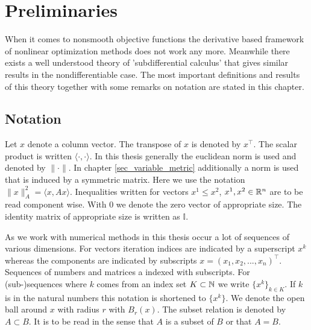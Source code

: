 \section{Preliminaries}
\label{sec_prelim}

When it comes to nonsmooth objective functions the  derivative based framework of nonlinear optimization methods does not work any more. Meanwhile there exists a well understood theory of 'subdifferential calculus' that gives similar results in the nondifferentiable case.
The most important definitions and results of this theory together with some remarks on notation are stated in this chapter.


\subsection{Notation}

Let \(x\) denote a column vector. The transpose of \(x\) is denoted by \(x^{\top}\). The scalar product is written \(\langle \cdot, \cdot \rangle\).
In this thesis generally the euclidean norm is used and denoted by \(\|\cdot\|\). In chapter \ref{sec_variable_metric} additionally a norm is used that is induced by a symmetric matrix. Here we use the notation \(\|x\|^2_A = {\langle x, Ax \rangle}\).
Inequalities written for vectors \(x^1 \leq x^2\), \(x^1, x^2 \in \mathbb{R}^n\) are to be read component wise.
With \(0\) we denote the zero vector of appropriate size.  The identity matrix of appropriate size is written as \(\mathbb{I}\).

As we work with numerical methods in this thesis occur a lot of sequences of various dimensions. For vectors iteration indices are indicated by a superscript \(x^k\) whereas the components are  indicated by subscripts \(x = \left(x_1,x_2,...,x_n\right)^{\top}\). Sequences of numbers and matrices a indexed with subscripts.
For (sub-)sequences where \(k\) comes from an index set \(K \subset \mathbb{N}\) we write \(\{x^k\}_{k \in K}\). If \(k\) is in the natural numbers this notation is shortened to \(\{x^k\}\).
We denote the open ball around \(x\) with radius \(r\) with \(B_{r}(x)\).
The subset relation is denoted by \(A\subset B\). It is to be read in the sense that \(A\) is a subset of \(B\) or that \(A=B\). 



